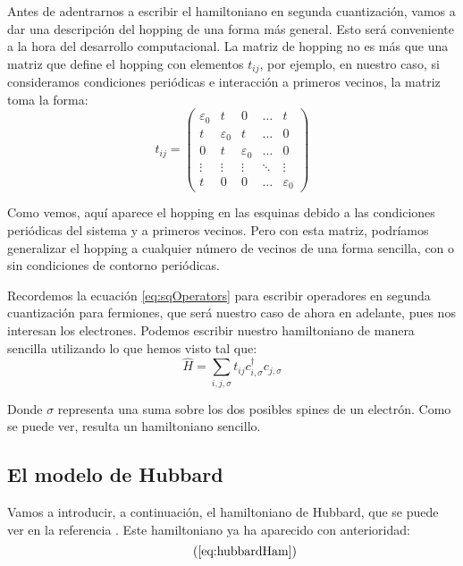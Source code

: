 \documentclass[12pt,twoside]{article}
\newcommand\recallLabel[1]
   {\csname labeled:#1\endcsname\tag{\ref{#1}}}
\begin{document}
Antes de adentrarnos a escribir el hamiltoniano en segunda cuantización, vamos a dar una descripción del hopping de una forma más general. Esto será conveniente a la hora del desarrollo computacional. La matriz de hopping no es más que una matriz que define el hopping con elementos $t_{ij}$, por ejemplo, en nuestro caso, si consideramos condiciones periódicas e interacción a primeros vecinos, la matriz toma la forma:
\begin{equation}
  t_{ij} = \left(\begin{array}{ccccc}
    \varepsilon_0 & t & 0 & \ldots & t \\
    t & \varepsilon_0 & t & \ldots & 0 \\
    0 & t & \varepsilon_0 & \ldots & 0 \\
    \vdots & \vdots & \vdots & \ddots & \vdots \\ 
    t & 0 & 0 & \ldots & \varepsilon_0
  \end{array}\right)
\end{equation}

Como vemos, aquí aparece el hopping en las esquinas debido a las condiciones periódicas del sistema y a primeros vecinos. Pero con esta matriz, podríamos generalizar el hopping a cualquier número de vecinos de una forma sencilla, con o sin condiciones de contorno periódicas.

Recordemos la ecuación \ref{eq:sqOperators} para escribir operadores en segunda cuantización para fermiones, que será nuestro caso de ahora en adelante, pues nos interesan los electrones. Podemos escribir nuestro hamiltoniano de manera sencilla utilizando lo que hemos visto tal que:
\begin{equation}
  \hat{H} = \sum_{i, j, \sigma}t_{ij}c_{i, \sigma}^{\dagger} c_{j, \sigma}
\end{equation}

Donde $\sigma$ representa una suma sobre los dos posibles spines de un electrón. Como se puede ver, resulta un hamiltoniano sencillo.
\subsection{El modelo de Hubbard}

Vamos a introducir, a continuación, el hamiltoniano de Hubbard, que se puede ver en la referencia \cite{MielkeHubbard}. Este hamiltoniano ya ha aparecido con anterioridad:
\begin{equation*}
  \recallLabel{eq:hubbardHam}
\end{equation*}
\end{document}
